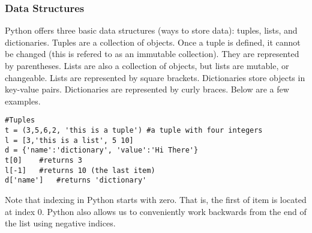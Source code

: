 %

\subsubsection*{Data Structures}
Python offers three basic data structures (ways to store data): tuples, lists, and dictionaries.  Tuples are a collection of objects.  Once a tuple is defined, it cannot be changed (this is refered to as an immutable collection).  They are represented by parentheses.  Lists are also a collection of objects, but lists are mutable, or changeable.  Lists are represented by square brackets.  Dictionaries store objects in key-value pairs.  Dictionaries are represented by curly braces.  Below are a few examples.
\begin{lstlisting}
#Tuples
t = (3,5,6,2, 'this is a tuple') #a tuple with four integers
l = [3,'this is a list', 5 10]
d = {'name':'dictionary', 'value':'Hi There'}
t[0]	#returns 3
l[-1]	#returns 10 (the last item)
d['name'] 	#returns 'dictionary'
\end{lstlisting}
Note that indexing in Python starts with zero.  That is, the first of item is located at index 0.  Python also allows us to conveniently work backwards from the end of the list using negative indices.

%

